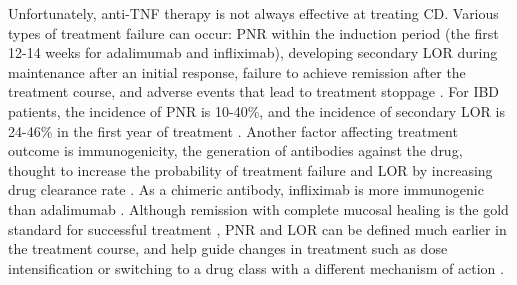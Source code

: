 Unfortunately, anti-\gls{TNF} therapy is not always effective at treating \gls{CD}.
Various types of treatment failure can occur:
\gls{PNR} within the induction period (the first 12-14 weeks for adalimumab and infliximab), developing secondary \gls{LOR} during maintenance after an initial response, failure to achieve remission after the treatment course, and adverse events that lead to treatment stoppage \autocite{roda2016LossResponseAntiTNFs}.
For \gls{IBD} patients, the incidence of \gls{PNR} is 10-40\%, and the incidence of secondary \gls{LOR} is 24-46\% in the first year of treatment \autocite{ben-horin2014OptimizingAntiTNFTreatments,flamant2018InflammatoryBowelDisease,kennedy2019PredictorsAntiTNFTreatment}.
Another factor affecting treatment outcome is immunogenicity, the generation of antibodies against the drug, 
thought to increase the probability of treatment failure and \gls{LOR} by increasing drug clearance rate \autocite{lichtenstein2013ComprehensiveReviewAntitumor,kennedy2019PredictorsAntiTNFTreatment}.
As a chimeric antibody, infliximab is more immunogenic than adalimumab \autocite{vermeire2018ImmunogenicityBiologicsInflammatory,kennedy2019PredictorsAntiTNFTreatment}.
Although remission with complete mucosal healing is the gold standard for successful treatment \autocite{roda2020CrohnDisease}, \gls{PNR} and \gls{LOR} can be defined much earlier in the treatment course, and help guide changes in treatment such as dose intensification or switching to a drug class with a different mechanism of action \autocite{lichtenstein2013ComprehensiveReviewAntitumor,ben-horin2014OptimizingAntiTNFTreatments}.

